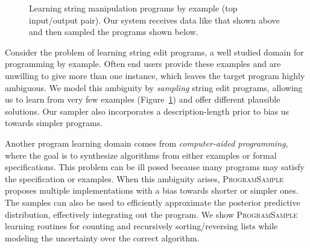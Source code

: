 \documentclass{article}
\newcommand{\theSystem}{\textsc{ProgramSample}}
\begin{document}
\begin{figure}
  \centering\vspace{-1.3cm}
  \caption{Learning string manipulation programs by example (top input/output pair). Our system receives data like that shown above and then sampled the programs shown below.} %
  \label{ambiguous}
  \vspace{-0.4cm}
\end{figure}


Consider the problem of learning string edit programs, a well studied domain for programming by example.
Often end users provide these examples and are unwilling to give more than one instance,
which leaves the target program highly ambiguous.
We model this ambiguity by \emph{sampling} string edit programs,
allowing us to learn from very few examples (Figure~\ref{ambiguous})
and offer different plausible solutions.
Our sampler also incorporates a description-length prior to bias us towards simpler programs.
 


Another program learning domain comes from \emph{computer-aided programming}, where the goal is to synthesize algorithms from
either examples or formal specifications.
This problem can be ill posed because many programs may satisfy the specification or examples.
When this ambiguity arises,
\theSystem{} proposes multiple implementations with a bias towards shorter or simpler ones.
The samples can also be used to efficiently approximate the posterior predictive distribution, effectively integrating out the program.
We show \theSystem{} learning routines for counting and recursively sorting/reversing lists
while modeling the uncertainty over the correct algorithm.
\end{document}
